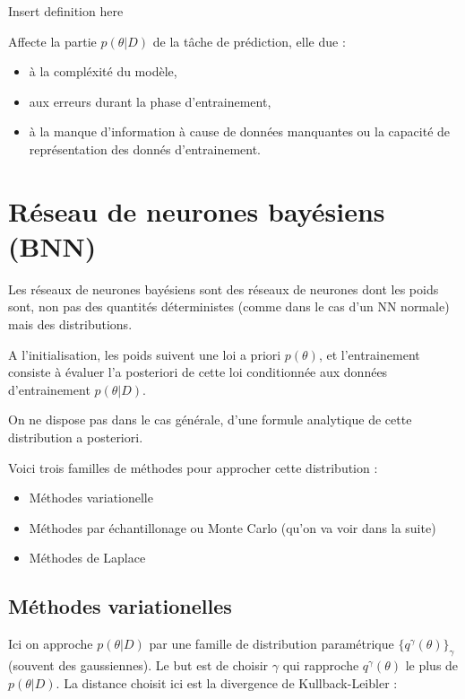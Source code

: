 \documentclass[french,12pt]{article}
\begin{document}
Insert definition here

Affecte la partie $p(\theta  | D)$ de la tâche de prédiction,
elle due :

\begin{itemize}
    \item à la compléxité du modèle,
    \item aux erreurs durant la phase d'entrainement,
    \item à la manque d'information à cause de données manquantes
          ou la capacité de représentation des donnés d'entrainement.
\end{itemize}

\pagebreak

\section{Réseau de neurones bayésiens (BNN)}


Les réseaux de neurones bayésiens sont des réseaux de neurones
dont les poids sont, non pas des quantités déterministes (comme
dans le cas d'un NN normale) mais des distributions.

A l'initialisation, les poids suivent une loi a priori $p(\theta)$,
et l'entrainement consiste à évaluer l'a posteriori de cette loi conditionnée
aux données d'entrainement $p(\theta | D)$.


On ne dispose pas dans le cas générale, d'une formule analytique de cette
distribution a posteriori.

Voici trois familles de méthodes pour approcher cette distribution :


\begin{itemize}
    \item Méthodes variationelle
    \item Méthodes par échantillonage ou
          Monte Carlo (qu'on va voir dans la suite)
    \item Méthodes de Laplace
\end{itemize}


\subsection{Méthodes variationelles}

Ici on approche $p(\theta | D)$ par une famille de distribution
paramétrique $\{q^{\gamma}(\theta)\}_{\gamma}$ (souvent des gaussiennes).
Le but est de choisir $\gamma$ qui rapproche $q^{\gamma}(\theta)$
le plus de $p(\theta | D)$. La distance choisit ici est la divergence
de Kullback-Leibler :
\end{document}
